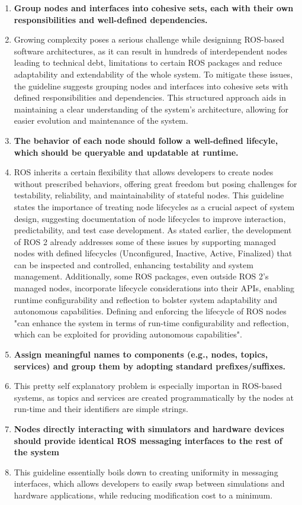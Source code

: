 \documentclass[%
paper=A4,               %
twoside=true,           %
openright,              %
11pt,                   %
bibliography=totoc,     %
titlepage=on,           %
DIV=12,                 %
BCOR=1.5cm,             %
parskip=half,            %
final
]{scrreprt}
\begin{document}
\begin{enumerate}[leftmargin=9mm, align=left]
		\item \textbf{Group nodes and interfaces into cohesive sets, each with their own responsibilities and well-defined dependencies.} 
		\item[]Growing complexity poses a serious challenge while designinng ROS-based software architectures, as it can result in hundreds of interdependent nodes leading to technical debt, limitations to certain ROS packages and reduce adaptability and extendability of the whole system. To mitigate these issues, the guideline suggests grouping nodes and interfaces into cohesive sets with defined responsibilities and dependencies. This structured approach aids in maintaining a clear understanding of the system's architecture, allowing for easier evolution and maintenance of the system. \autocite{malavoltaHowYouArchitect2020}
		\item \textbf{The behavior of each node should follow a well-defined lifecyle, which should be queryable and updatable at runtime.} 
		\item[]ROS inherits a certain flexibility that allows developers to create nodes without prescribed behaviors, offering great freedom but posing challenges for testability, reliability, and maintainability of stateful nodes. This guideline states the importance of treating node lifecycles as a crucial aspect of system design, suggesting documentation of node lifecycles to improve interaction, predictability, and test case development. As stated earlier, the development of ROS 2 already addresses some of these issues by supporting managed nodes with defined lifecycles (Unconfigured, Inactive, Active, Finalized) that can be inspected and controlled, enhancing testability and system management. Additionally, some ROS packages, even outside ROS 2's managed nodes, incorporate lifecycle considerations into their APIs, enabling runtime configurability and reflection to bolster system adaptability and autonomous capabilities. \autocite{malavoltaHowYouArchitect2020}  Defining and enforcing the lifecycle of ROS nodes "can enhance the system in terms of run-time configurability and reflection, which can be exploited for providing autonomous capabilities". \autocite{malavoltaHowYouArchitect2020}
		\item  \textbf{Assign meaningful names to components (e.g., nodes, topics, services) and group them by adopting standard prefixes/suffixes.} 
		\item[] This pretty self explanatory problem is especially importan in ROS-based systems, as topics and services are created programmatically by the nodes at run-time and their identifiers are simple strings. \autocite{malavoltaHowYouArchitect2020}
		\item  \textbf{Nodes directly interacting with simulators and hardware devices should provide identical ROS messaging interfaces to the rest of the system} 
		\item[] This guideline essentially boils down to creating uniformity in messaging interfaces, which allows developers to easily swap between simulations and hardware applications, while reducing modification cost to a minimum. \autocite{malavoltaHowYouArchitect2020}
		

\end{enumerate}
\end{document}
